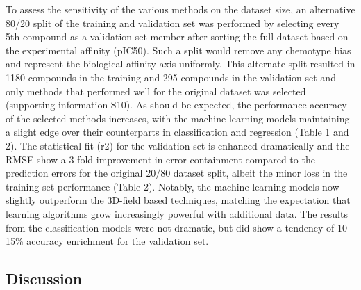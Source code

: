 To assess the sensitivity of the various methods on the dataset size, an alternative 80/20 split of the training and validation set was performed by selecting every 5th compound as a validation set member after sorting the full dataset based on the experimental affinity (pIC50).  Such a split would remove any chemotype bias and represent the biological affinity axis uniformly.  This alternate split resulted in 1180 compounds in the training and 295 compounds in the validation set and only methods that performed well for the original dataset was selected (supporting information S10).  As should be expected, the performance accuracy of the selected methods increases, with the machine learning models maintaining a slight edge over their counterparts in classification and regression (Table 1 and 2).  The statistical fit (r2) for the validation set is enhanced dramatically and the RMSE show a 3-fold improvement in error containment compared to the prediction errors for the original 20/80 dataset split, albeit the minor loss in the training set performance (Table 2).  Notably, the machine learning models now slightly outperform the 3D-field based techniques, matching the expectation that learning algorithms grow increasingly powerful with additional data.  The results from the classification models were not dramatic, but did show a tendency of 10-15\% accuracy enrichment for the validation set.  

\subsection{Discussion}

